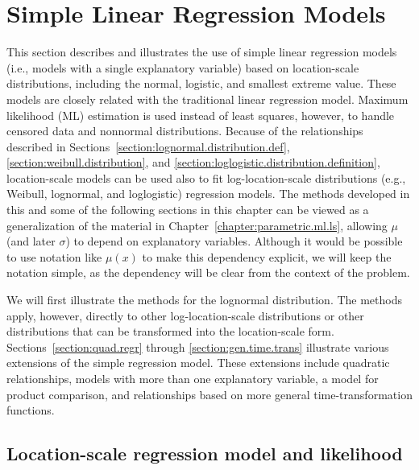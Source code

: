 \section{Simple Linear Regression Models}
\label{section:simple.linear.reg}
This section describes and illustrates the use of simple linear
regression models (i.e., models with a single explanatory variable)
based on location-scale distributions, including the normal, logistic,
and smallest extreme value.  These models are closely related with the
traditional linear regression model. Maximum likelihood (ML) 
estimation is used instead of least squares, however, to handle 
censored data and nonnormal distributions. 
Because of the relationships described in
Sections~\ref{section:lognormal.distribution.def},
\ref{section:weibull.distribution}, and
\ref{section:loglogistic.distribution.definition}, location-scale models
can be used also to fit log-location-scale distributions (e.g.,
Weibull, lognormal, and loglogistic) regression models.  The methods
developed in this and some of the following sections in this chapter
can be viewed as a generalization of the material in
Chapter~\ref{chapter:parametric.ml.ls}, allowing $\mu$ (and later
$\sigma$) to depend on explanatory variables.  Although it would be
possible to use notation like $\mu(x)$ to make this dependency
explicit, we will keep the notation simple, as the dependency will
be clear from the context of the problem.

We will first illustrate the methods for the lognormal distribution.
The methods apply, however, directly to other log-location-scale
distributions or other distributions that can be transformed into
the location-scale form. Sections~\ref{section:quad.regr} through
\ref{section:gen.time.trans} illustrate various extensions of
the simple regression model. These extensions include quadratic
relationships, models with more than one explanatory variable, a model
for product comparison, and relationships based on more general
time-transformation functions.

\subsection{Location-scale regression model and likelihood}
\label{section:ls.regr.model}

